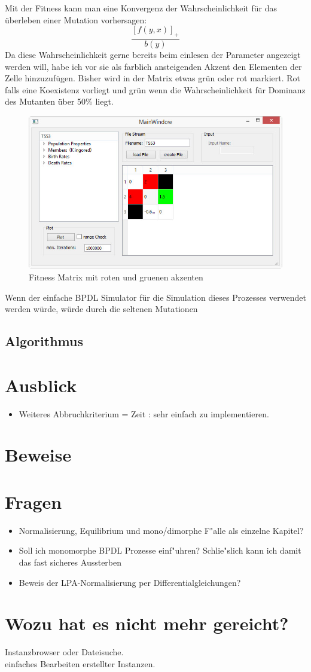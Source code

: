 \documentclass[11pt, a4paper, german]{article}
\begin{document}
Mit der Fitness kann man eine Konvergenz der Wahrscheinlichkeit für das überleben einer Mutation vorhersagen:
\[ \frac{\left[ f(y,x)\right]_+ }{b(y)} \]
Da diese Wahrscheinlichkeit gerne bereits beim einlesen der Parameter angezeigt werden will, habe ich vor sie als farblich ansteigenden Akzent den Elementen der Zelle hinzuzufügen. Bisher wird in der Matrix etwas grün oder rot markiert. Rot falls eine Koexistenz vorliegt und grün wenn die Wahrscheinlichkeit für Dominanz des Mutanten über 50\% liegt.
\begin{figure}[H]
	\centering
	\includegraphics[width=0.7\linewidth]{./Pictures/MainWindow_red_green_loaded}
	\caption[MainWindow_redGreenFitness]{Fitness Matrix mit roten und gruenen akzenten}
	\label{fig:MainWindow_red_green_loaded}
\end{figure}
Wenn der einfache BPDL Simulator für die Simulation dieses Prozesses verwendet werden würde, würde durch die seltenen Mutationen
	
	\subsection{Algorithmus}
\clearpage
\section{Ausblick}

\begin{itemize}
	\item Weiteres Abbruchkriterium = Zeit : sehr einfach zu implementieren.
\end{itemize}

\clearpage


\clearpage

\section{Beweise}


\section{Fragen}
\begin{itemize}
	\item Normalisierung, Equilibrium und mono/dimorphe F"alle als einzelne Kapitel?
	\item Soll ich monomorphe BPDL Prozesse einf"uhren? Schlie"slich kann ich damit das fast sicheres Aussterben 
	\item Beweis der LPA-Normalisierung per Differentialgleichungen?
\end{itemize}

\section{Wozu hat es nicht mehr gereicht?}
Instanzbrowser oder Dateisuche.\\
einfaches Bearbeiten erstellter Instanzen.\\
\end{document}
